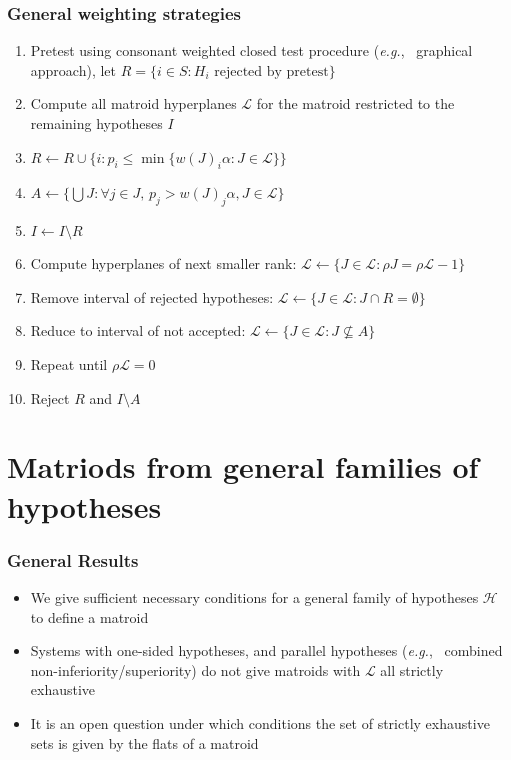 \documentclass[bigger]{beamer}
\newcommand{\eg}{{\sl e.g.},~}
\begin{document}
\begin{frame}
\frametitle{General weighting strategies}

\begin{enumerate}
\item Pretest using consonant weighted closed test procedure (\eg
  graphical approach), let $R = \{i \in S: H_i \textrm{ rejected by pretest}\}$
\item Compute all matroid hyperplanes $\mathscr{L}$ for the matroid
  restricted to the remaining hypotheses $I$
\item $R \gets R \cup \{i: p_i \leq \min\{ w(J)_{i}\alpha: J \in
  \mathscr{L} \} \}$
\item $A \gets \{\bigcup J: \forall j \in J,\, p_j > w(J)_{j}\alpha, J \in \mathscr{L} \}$
\item $I \gets I \setminus R$
\item Compute hyperplanes of next smaller rank: $\mathscr{L} \gets \{J\in \mathscr{L}: \rho J = \rho
 \mathscr{L} - 1\}$
\item Remove interval of rejected hypotheses: $\mathscr{L} \gets \{J \in \mathscr{L}: J \cap R = \emptyset\}$
\item Reduce to interval of not accepted: $\mathscr{L} \gets \{J \in \mathscr{L}: J \nsubseteq A\}$
\item Repeat until $\rho \mathscr{L} = 0$
\item Reject $R$ and $I \setminus A$
\end{enumerate}
\end{frame}
\section{Matriods from general families of hypotheses}



\begin{frame}
\frametitle{General Results}
\begin{itemize}
\item We give sufficient necessary conditions for a general family of
  hypotheses $\mathscr{H}$ to define a matroid
\item Systems with one-sided hypotheses, and parallel hypotheses (\eg
 combined non-inferiority/superiority) do not give matroids with
 $\mathscr{L}$ all strictly exhaustive
\item It is an open question under which conditions the set of
  strictly exhaustive sets is given by the flats of a matroid
\end{itemize}


\end{frame}
\end{document}
